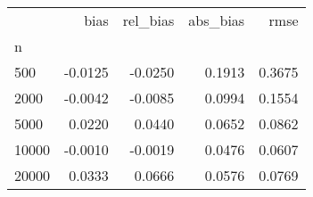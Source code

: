 \begin{tabular}{lrrrr}
\toprule
{} &    bias &  rel\_bias &  abs\_bias &   rmse \\
n     &         &           &           &        \\
\midrule
500   & -0.0125 &   -0.0250 &    0.1913 & 0.3675 \\
2000  & -0.0042 &   -0.0085 &    0.0994 & 0.1554 \\
5000  &  0.0220 &    0.0440 &    0.0652 & 0.0862 \\
10000 & -0.0010 &   -0.0019 &    0.0476 & 0.0607 \\
20000 &  0.0333 &    0.0666 &    0.0576 & 0.0769 \\
\bottomrule
\end{tabular}
